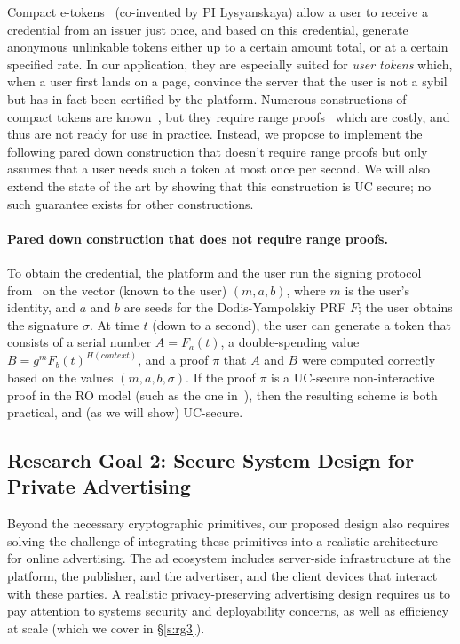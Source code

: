 Compact e-tokens~\cite{caholy05,chklm06} (co-invented by PI Lysyanskaya) allow a user to receive a credential from an issuer just once, and based on this credential, generate anonymous unlinkable tokens either up to a certain amount total, or at a certain specified rate.  In our application, they are especially suited for \emph{user tokens} which, when a user first lands on a page, convince the server that the user is not a sybil but has in fact been certified by the platform.  Numerous constructions of compact tokens are known~\cite{caholy05,chklm06,bckl09}, but they require range proofs~\cite{AC:CamChaShe08} which are costly, and thus are not ready for use in practice.  Instead, we propose to implement the following pared down construction that doesn't require range proofs but only assumes that a user needs such a token at most once per second.  We will also extend the state of the art by showing that this construction is UC secure; no such guarantee exists for other constructions.

\paragraph{Pared down construction that does not require range proofs.} To obtain the credential, the platform and the user run the signing protocol from~\cite{C:CamLys04} on the vector (known to the user) $(m,a,b)$, where $m$ is the user's identity, and $a$ and $b$ are seeds for the Dodis-Yampolskiy PRF $F$; the user obtains the signature $\sigma$.  At time $t$ (down to a second), the user can generate a token that consists of a serial number $A=F_a(t)$, a double-spending value $B = g^m F_b(t)^{H(\mathit{context})}$, and a proof $\pi$ that $A$ and $B$ were computed correctly based on the values $(m,a,b,\sigma)$. If the proof $\pi$ is a UC-secure non-interactive proof in the RO model (such as the one in~\cite{lysros22}), then the resulting scheme is both practical, and (as we will show) UC-secure.

\subsection{Research Goal 2: Secure System Design for Private Advertising}
\label{s:rg2}

%
Beyond the necessary cryptographic primitives, our proposed design also requires solving the challenge of integrating these primitives into a realistic architecture for online advertising.
%
The ad ecosystem includes server-side infrastructure at the platform, the publisher, and the advertiser, and the client devices that interact with these parties.
%
A realistic privacy-preserving advertising design requires us to pay attention to systems security and deployability concerns, as well as efficiency at scale (which we cover in \S\ref{s:rg3}).
%

